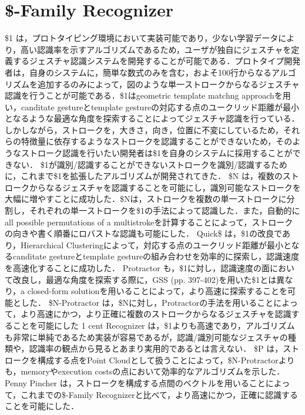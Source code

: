 

\section{\$-Family Recognizer}
\$1 \cite{Wobbrock:2007:GWL:1294211.1294238}は，プロトタイピング環境において実装可能であり，少ない学習データにより，高い認識率を示すアルゴリズムであるため，ユーザが独自にジェスチャを定義するジェスチャ認識システムを開発することが可能である．プロトタイプ開発者は，自身のシステムに，簡単な数式のみを含む，およそ100行からなるアルゴリズムを追加するのみによって，図のような単一ストロークからなるジェスチャ認識を行うことが可能である．\$1はgeometric template matchng approachを用い，canditate gestureとtemplate gestureの対応する点のユークリッド距離が最小となるような最適な角度を探索することによってジェスチャ認識を行っている．
しかしながら，ストロークを，大きさ，向き，位置に不変にしているため，それらの特徴量に依存するようなストロークを認識することができないため，そのようなストローク認識を行いたい開発者は\$1を自身のシステムに採用することができない．
\$1が識別/認識することができないストロークを識別/認識するために，これまで\$1を拡張したアルゴリズムが開発されてきた．
\$N \cite{Anthony:2010:LMR:1839214.1839258}は，複数のストロークからなるジェスチャを認識することを可能にし，識別可能なストロークを大幅に増やすことに成功した．\$Nは，ストロークを複数の単一ストロークに分割し，それぞれの単一ストロークを\$1の手法によって認識した．また，自動的にall possible permutations of a multistrokeを計算することによって，ストロークの向きや書く順番にロバストな認識も可能にした．
Quick\$ \cite{Reaver:2011:MQU:2021164.2021183}は，\$1の改良であり，Hierarchical Clusteringによって，対応する点のユークリッド距離が最小となるcanditate gestureとtemplate gestureの組み合わせを効率的に探索し，認識速度を高速化することに成功した．
Protractor \cite{Li:2010:PFA:1753326.1753654}も，\$1に対し，認識速度の面において改良し，最適な角度を探索する際に，GSS \cite{Press:1992:NRC:148286}(pp. 397-402)を用いた\$1とは異なり，a closed-form solutionを用いることによって，より高速に探索することを可能とした．
\$N-Protractor \cite{Anthony:2012:NFA:2305276.2305296}は，\$Nに対し，Protractorの手法を用いることによって，より高速にかつ，より正確に複数のストロークからなるジェスチャを認識することを可能にした
1 cent Recognizer \cite{Herold:2012:CRF:2331067.2331074}は，\$1よりも高速であり，アルゴリズムも非常に単純であるため実装が容易であるが，認識/識別可能なジェスチャの種類や，認識率の観点から見るとあまり実用的であるとは言えない．
\$P \cite{Vatavu:2012:GPC:2388676.2388732}は，ストロークを構成する点をPoint Cloudとして扱うことによって，\$N-Protractorよりも，memoryやexecution costsの点において効率的なアルゴリズムを示した．
Penny Pincher \cite{Taranta:2015:PPB:2788890.2788925}は，ストロークを構成する点間のベクトルを用いることによって，これまでの\$-Family Recognizerと比べて，より高速にかつ，正確に認識することを可能にした．

